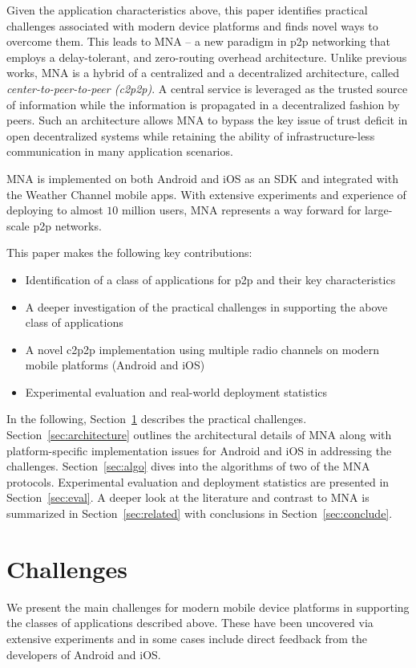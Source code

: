 \documentclass[conference]{IEEEtran}
\begin{document}
Given the application characteristics above, this paper identifies
practical challenges associated with modern device platforms and finds
novel ways to overcome them.  This leads to MNA -- a new paradigm in
p2p networking that employs a delay-tolerant, and zero-routing
overhead architecture.  Unlike previous works, MNA is a hybrid of a
centralized and a decentralized architecture, called
\emph{center-to-peer-to-peer (c2p2p)}. A central service is leveraged
as the trusted source of information while the information is
propagated in a decentralized fashion by peers. Such an architecture
allows MNA to bypass the key issue of trust deficit in open
decentralized systems while retaining the ability of
infrastructure-less communication in many application scenarios.

MNA is implemented on both Android and iOS as an SDK and integrated
with the Weather Channel mobile apps. With extensive experiments and
experience of deploying to almost $10$ million users, MNA represents a
way forward for large-scale p2p networks.

This paper makes the following key contributions:
\begin{itemize}
\item Identification of a class of applications for p2p and their key
  characteristics
\item A deeper investigation of the practical challenges in supporting
  the above class of applications
\item A novel c2p2p implementation using multiple radio
  channels on modern mobile platforms (Android and iOS)
\item Experimental evaluation and real-world deployment statistics
\end{itemize}

In the following, Section~\ref{sec:challenges} describes the practical
challenges. Section~\ref{sec:architecture} outlines the architectural
details of MNA along with platform-specific implementation issues for
Android and iOS in addressing the challenges. Section~\ref{sec:algo}
dives into the algorithms of two of the MNA protocols. Experimental
evaluation and deployment statistics are presented in
Section~\ref{sec:eval}.  A deeper look at the literature and contrast
to MNA is summarized in Section~\ref{sec:related} with conclusions in
Section~\ref{sec:conclude}.
%
\section{Challenges}
\label{sec:challenges}
%
We present the main challenges for modern mobile device platforms in
supporting the classes of applications described above. These have been
uncovered via extensive experiments and in some cases include direct
feedback from the developers of Android and iOS.
%
\end{document}
